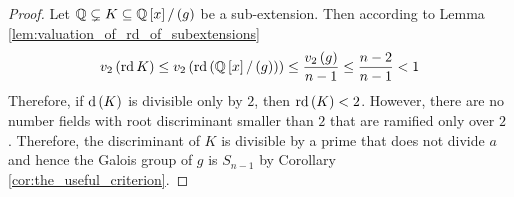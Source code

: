 \documentclass[../main.tex]{subfiles}
\begin{document}
\begin{proof}
  Let $\mathbb{Q} \subsetneq K \subseteq \mathbb{Q}\left[ x \right] / \left( g \right)$ be a sub-extension.
  Then according to Lemma \ref{lem:valuation_of_rd_of_subextensions} 
  \[
    v_2\left( \operatorname{\rm rd} K \right) \leq v_2\left( \operatorname{\rm rd}\left( \mathbb{Q}\left[ x \right] / \left( g \right) \right) \right) \leq \frac{v_2\left( g \right)}{n - 1}  \leq
    \frac{n - 2}{n - 1} < 1
  \]
  Therefore, if $\operatorname{\rm d}\left( K \right)$ is divisible only by $2$, then $\operatorname{\rm rd}\left( K \right) < 2$.
  However, there are no number fields with root discriminant smaller than $2$ that are ramified only over $2$ .
  Therefore, the discriminant of $K$ is divisible by a prime that does not divide $a$ and hence the Galois group of $g$ is $S_{n-1}$ by Corollary \ref{cor:the_useful_criterion}.
\end{proof}
\end{document}
